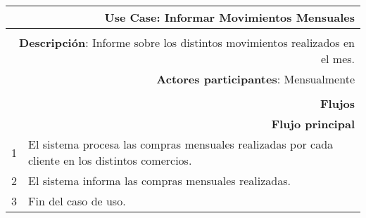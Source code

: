 \begin{tabularx}{\textwidth}{| r | X |}
\hline
\multicolumn{2}{|X|}{
\textbf{Use Case}: Informar Movimientos Mensuales} \\

\hline
\multicolumn{2}{|c|}{\cellcolor[gray]{0.6}} \\

\hline
\multicolumn{2}{|X|}{
\textbf{Descripción}: Informe sobre los distintos movimientos realizados en el mes.} \\

\hline
\multicolumn{2}{|X|}{
\textbf{Actores participantes}: Mensualmente }\\

\hline
\multicolumn{2}{|c|}{\cellcolor[gray]{0.6} } \\

\hline
\multicolumn{2}{|X|}{
\textbf{Flujos}} \\

\hline
\multicolumn{2}{|X|}{
\textbf{Flujo principal}} \\

\hline
1 & El sistema procesa las compras mensuales realizadas por cada cliente en los distintos
comercios. \\
\hline
2 & El sistema informa las compras mensuales realizadas. \\

\hline
3 & Fin del caso de uso. \\

\hline
\end{tabularx}

